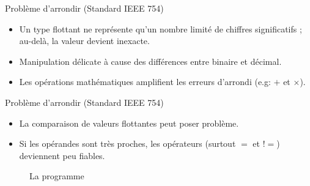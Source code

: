 \documentclass[10pt]{beamer}
\begin{document}
\begin{frame}{Problème d'arrondir (Standard IEEE 754)}
    \begin{itemize}
        \item Un type flottant ne représente qu’un nombre limité de chiffres significatifs ; au-delà, la valeur devient inexacte.
        \item Manipulation délicate à cause des différences entre binaire et décimal.
        \item Les opérations mathématiques amplifient les erreurs d’arrondi (e.g: $+$ et $\times$).
    \end{itemize}

\end{frame}


\begin{frame}{Problème d'arrondir (Standard IEEE 754)}
    \begin{itemize}
        \item La comparaison de valeurs flottantes peut poser problème.
        \item Si les opérandes sont très proches, les opérateurs (surtout $=$ et $!=$) deviennent peu fiables.
    \end{itemize}

    \begin{figure}[h]
        \centering
        \caption{La programme}
    \end{figure}
\end{frame}
\end{document}

